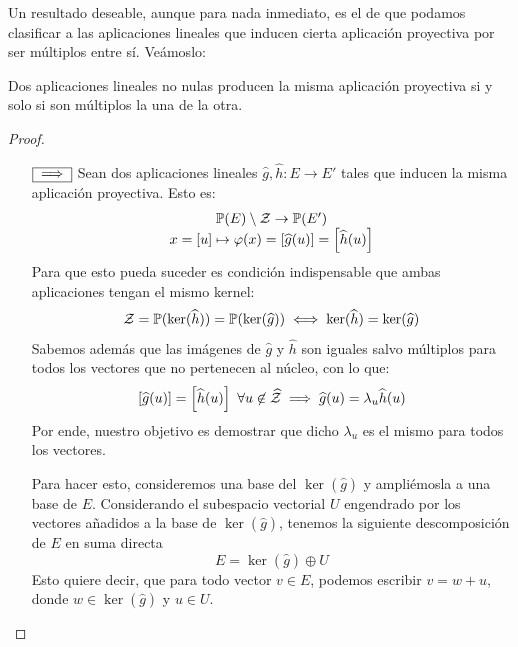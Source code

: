Un resultado deseable, aunque para nada inmediato, es el de que podamos clasificar a las aplicaciones lineales que inducen cierta aplicación proyectiva por ser múltiplos entre sí. Veámoslo:
\begin{theo}
	\label{C4_teo_lemaCorrespondencia}
	Dos aplicaciones lineales no nulas producen la misma aplicación proyectiva si y solo si son múltiplos la una de la otra.
\end{theo}
\begin{proof}
	\begin{itemize}
		\item[$\fbox{$\implies$}$] Sean dos aplicaciones lineales $\widehat{g},\widehat{h}:E\to E'$ tales que inducen la misma aplicación proyectiva. Esto es:
		\[\begin{array}{c}
		\mathbb{P}(E)\setminus\mathcal{Z}\to\mathbb{P}(E')\\
		x=\left [ u \right ]\mapsto\varphi(x)=\left [ \widehat{g}(u) \right ]=\left [ \widehat{h}(u) \right ]
		\end{array}\]
		Para que esto pueda suceder es condición indispensable que ambas aplicaciones tengan el mismo kernel:
		\[\mathcal{Z}=\mathbb{P}(\ker(\widehat{h}))=\mathbb{P}(\ker(\widehat{g}))\iff \ker(\widehat{h})=\ker(\widehat{g})\]
		Sabemos además que las imágenes de $\widehat{g}$ y $\widehat{h}$ son iguales salvo múltiplos para todos los vectores que no pertenecen al núcleo, con lo que:
		\[\class{\widehat{g}(u)}=\class{\widehat{h}(u)}\ \forall u\not\in\widehat{\mc{Z}}\ra\widehat{g}(u)=\lambda_u\widehat{h}(u)\]
		Por ende, nuestro objetivo es demostrar que dicho $\lambda_u$ es el mismo para todos los vectores.
		
		Para hacer esto, consideremos una base del $\ker(\widehat{g})$ y ampliémosla a una base de $E$. Considerando el subespacio vectorial $U$ engendrado por los vectores añadidos a la base de $\ker(\widehat{g})$, tenemos la siguiente descomposición de $E$ en suma directa
		\[E=\ker(\widehat{g})\oplus U\]
		Esto quiere decir, que para todo vector $v\in E$, podemos escribir $v=w+u$, donde $w\in\ker(\widehat{g})$ y $u\in U$.
		

\end{itemize}
\end{proof}
